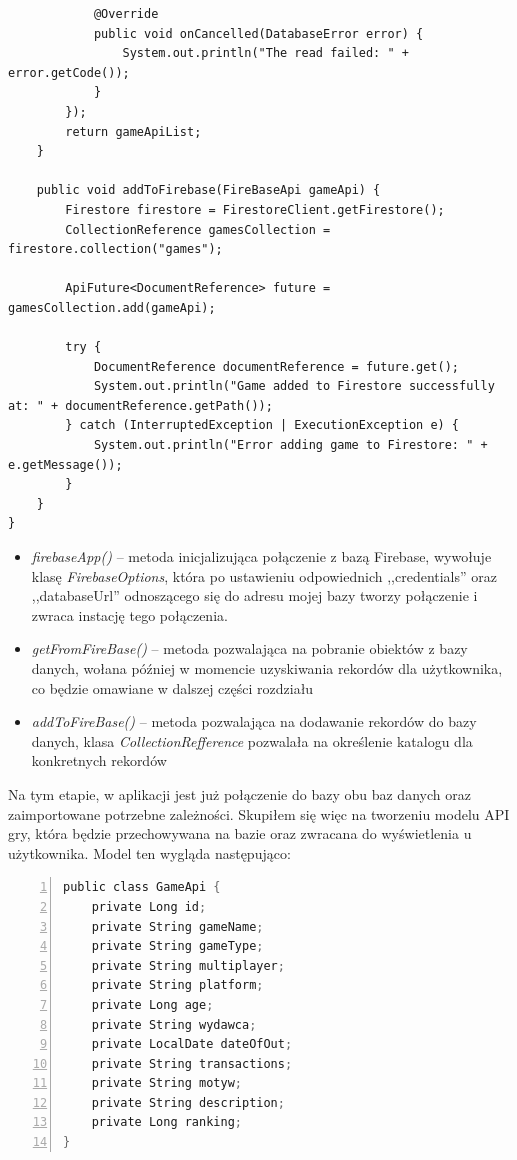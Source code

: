 \begin{lstlisting}
            @Override
            public void onCancelled(DatabaseError error) {
                System.out.println("The read failed: " + error.getCode());
            }
        });
        return gameApiList;
    }

    public void addToFirebase(FireBaseApi gameApi) {
        Firestore firestore = FirestoreClient.getFirestore();
        CollectionReference gamesCollection = firestore.collection("games");

        ApiFuture<DocumentReference> future = gamesCollection.add(gameApi);

        try {
            DocumentReference documentReference = future.get();
            System.out.println("Game added to Firestore successfully at: " + documentReference.getPath());
        } catch (InterruptedException | ExecutionException e) {
            System.out.println("Error adding game to Firestore: " + e.getMessage());
        }
    }
}
\end{lstlisting}
\begin{itemize}
\item \textit{firebaseApp()} -- metoda inicjalizująca połączenie z bazą Firebase, wywołuje klasę \textit{FirebaseOptions}, która po ustawieniu odpowiednich ,,credentials'' oraz ,,databaseUrl'' odnoszącego się do adresu mojej bazy tworzy połączenie i zwraca instację tego połączenia.

\item \textit{getFromFireBase()} -- metoda pozwalająca na pobranie obiektów z bazy danych, wołana później w momencie uzyskiwania rekordów dla użytkownika, co będzie omawiane w dalszej części rozdziału

\item \textit{addToFireBase()} -- metoda pozwalająca na dodawanie rekordów do bazy danych, klasa \textit{CollectionRefference} pozwalała na określenie katalogu dla konkretnych rekordów 
\end{itemize}

Na tym etapie, w aplikacji jest już połączenie do bazy obu baz danych oraz zaimportowane potrzebne zależności. Skupiłem się więc na tworzeniu modelu API gry, która będzie przechowywana na bazie oraz zwracana do wyświetlenia u użytkownika. Model ten wygląda następująco:
\begin{lstlisting}[language=C, mathescape, frame=single, numbers=left, xleftmargin=2em, framexleftmargin=2em, basicstyle=\ttfamily\bfseries, caption={Klasa API dla gry}, label={Klasa API dla gry}]
public class GameApi {
    private Long id;
    private String gameName;
    private String gameType;
    private String multiplayer;
    private String platform;
    private Long age;
    private String wydawca;
    private LocalDate dateOfOut;
    private String transactions;
    private String motyw;
    private String description;
    private Long ranking;
}
\end{lstlisting}


